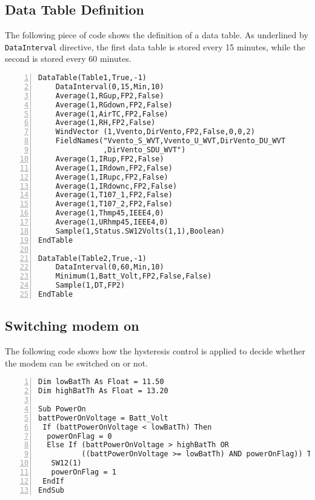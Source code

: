 \subsection{Data Table Definition}
The following piece of code shows the definition of a data table.
As underlined by {\tt DataInterval} directive, the first data table is stored every 15 minutes, while the second is stored every 60 minutes.
\begin{lstlisting}[numbers=left, breaklines=true]
DataTable(Table1,True,-1)
	DataInterval(0,15,Min,10)
	Average(1,RGup,FP2,False)
	Average(1,RGdown,FP2,False)
	Average(1,AirTC,FP2,False)
	Average(1,RH,FP2,False)
	WindVector (1,Vvento,DirVento,FP2,False,0,0,2)
	FieldNames("Vvento_S_WVT,Vvento_U_WVT,DirVento_DU_WVT
	           ,DirVento_SDU_WVT")
	Average(1,IRup,FP2,False)
	Average(1,IRdown,FP2,False)
	Average(1,IRupc,FP2,False)
	Average(1,IRdownc,FP2,False)
	Average(1,T107_1,FP2,False)
	Average(1,T107_2,FP2,False)
	Average(1,Thmp45,IEEE4,0)
	Average(1,URhmp45,IEEE4,0)
	Sample(1,Status.SW12Volts(1,1),Boolean)
EndTable

DataTable(Table2,True,-1)
	DataInterval(0,60,Min,10)
	Minimum(1,Batt_Volt,FP2,False,False)
	Sample(1,DT,FP2)
EndTable
\end{lstlisting}
\clearpage
\subsection{Switching modem on}
The following code shows how the hysteresis control is applied to decide whether the modem can be switched on or not.
\begin{lstlisting}[numbers=left, breaklines=true]
Dim lowBatTh As Float = 11.50
Dim highBatTh As Float = 13.20

Sub PowerOn
battPowerOnVoltage = Batt_Volt
 If (battPowerOnVoltage < lowBatTh) Then
  powerOnFlag = 0
  Else If (battPowerOnVoltage > highBatTh OR 
          ((battPowerOnVoltage >= lowBatTh) AND powerOnFlag)) Then
   SW12(1)
   powerOnFlag = 1
 EndIf
EndSub
\end{lstlisting}
